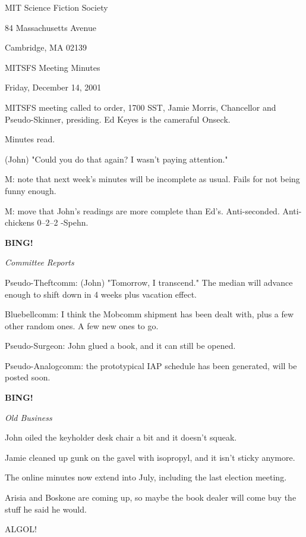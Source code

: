 \documentclass[12pt]{article}
\newcommand{\bing}{{\bf BING!} }
\newcommand{\goto}[1]{\bing \vskip 12pt \centerline{{\em{#1}}}}
\begin{document}
\begin{center}

MIT Science Fiction Society 

84 Massachusetts Avenue

Cambridge, MA 02139

\vspace{12pt}

MITSFS Meeting Minutes 

Friday, December 14, 2001

\end{center}
 
\vspace{18pt}

\setlength{\parskip}{6pt}

\noindent
MITSFS meeting called to order, 1700 SST, Jamie Morris, Chancellor and Pseudo-Skinner, presiding.  Ed Keyes is the cameraful Onseck.

Minutes read.

(John) "Could you do that again? I wasn't paying attention."

M: note that next week's minutes will be incomplete as usual. Fails for not being funny enough.

M: move that John's readings are more complete than Ed's. Anti-seconded. Anti-chickens 0--2--2 -Spehn.

\goto{Committee Reports}

Pseudo-Theftcomm: (John) "Tomorrow, I transcend." The median will advance enough to shift down in 4 weeks plus vacation effect.

Bluebellcomm: I think the Mobcomm shipment has been dealt with, plus a few other random ones. A few new ones to go.

Pseudo-Surgeon: John glued a book, and it can still be opened.

Pseudo-Analogcomm: the prototypical IAP schedule has been generated, will be posted soon.

\goto{Old Business}

John oiled the keyholder desk chair a bit and it doesn't squeak.

Jamie cleaned up gunk on the gavel with isopropyl, and it isn't sticky anymore.

The online minutes now extend into July, including the last election meeting.

Arisia and Boskone are coming up, so maybe the book dealer will come buy the stuff he said he would.

ALGOL!
\end{document}
